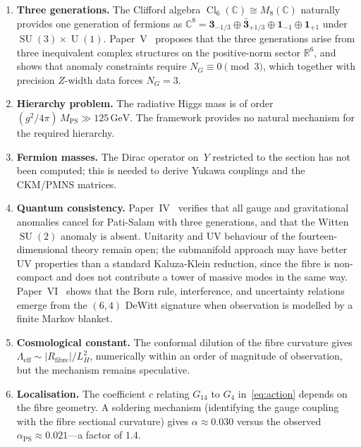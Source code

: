\documentclass[12pt,a4paper]{article}
\theoremstyle{definition}
\newcommand{\SU}{\operatorname{SU}}
\newcommand{\U}{\operatorname{U}}
\newcommand{\Cl}{\operatorname{Cl}}
\newcommand{\R}{\mathbb{R}}
\newcommand{\C}{\mathbb{C}}
\begin{document}
\begin{enumerate}
\item \textbf{Three generations.}
The Clifford algebra $\Cl_6(\C) \cong M_8(\C)$ naturally provides one generation of fermions as $\C^8 = \mathbf{3}_{-1/3} \oplus \bar{\mathbf{3}}_{+1/3} \oplus \mathbf{1}_{-1} \oplus \mathbf{1}_{+1}$ under $\SU(3) \times \U(1)$.
Paper~V~\cite{Paper5} proposes that the three generations arise from three inequivalent complex structures on the positive-norm sector $\R^6$, and shows that anomaly constraints require $N_G \equiv 0 \pmod{3}$, which together with precision $Z$-width data forces $N_G = 3$.

\item \textbf{Hierarchy problem.}
The radiative Higgs mass is of order $(g^2/4\pi)\,M_{\mathrm{PS}} \gg 125\,\text{GeV}$.
The framework provides no natural mechanism for the required hierarchy.

\item \textbf{Fermion masses.}
The Dirac operator on~$Y$ restricted to the section has not been computed; this is needed to derive Yukawa couplings and the CKM/PMNS matrices.

\item \textbf{Quantum consistency.}
Paper~IV~\cite{Paper4} verifies that all gauge and gravitational anomalies cancel for Pati-Salam with three generations, and that the Witten $\SU(2)$ anomaly is absent.
Unitarity and UV behaviour of the fourteen-dimensional theory remain open; the submanifold approach may have better UV properties than a standard Kaluza-Klein reduction, since the fibre is non-compact and does not contribute a tower of massive modes in the same way.
Paper~VI~\cite{Paper6} shows that the Born rule, interference, and uncertainty relations emerge from the $(6,4)$ DeWitt signature when observation is modelled by a finite Markov blanket.

\item \textbf{Cosmological constant.}
The conformal dilution of the fibre curvature gives $\Lambda_{\mathrm{eff}} \sim |R_{\mathrm{fibre}}|/L_H^2$, numerically within an order of magnitude of observation, but the mechanism remains speculative.

\item \textbf{Localisation.}
The coefficient $c$ relating $G_{14}$ to $G_4$ in~\eqref{eq:action} depends on the fibre geometry.
A soldering mechanism (identifying the gauge coupling with the fibre sectional curvature) gives $\alpha \approx 0.030$ versus the observed $\alpha_{\mathrm{PS}} \approx 0.021$---a factor of $1.4$.
\end{enumerate}
\end{document}
